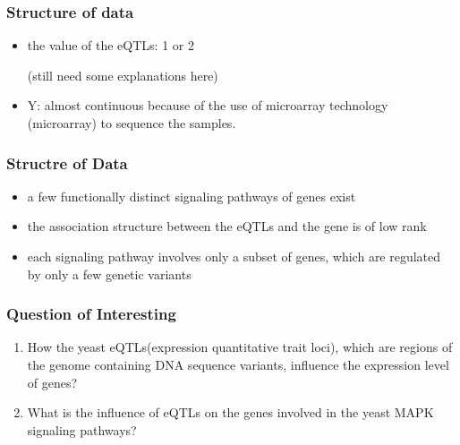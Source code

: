 \begin{frame}\frametitle{Structure of data}
    \begin{itemize}
        \item the value of the eQTLs: 1 or 2
    
        (still need some explanations here)

        \item Y: almost continuous because of the use of microarray technology (microarray) to sequence the samples.
      
    \end{itemize}
\end{frame}

\begin{frame}\frametitle{Structre of Data}
    \begin{itemize}
        \item a few functionally distinct signaling pathways of genes exist
        \item the association structure between the eQTLs and the gene is of low rank
        \item each signaling pathway involves only a subset of genes, which are regulated by only a few genetic variants
    \end{itemize}
\end{frame}



   

\begin{frame}\frametitle{Question of Interesting}
    \begin{enumerate}
        \item How the yeast eQTLs(expression quantitative trait loci), which are regions of the genome containing DNA sequence variants, influence the expression level of genes? 
        \item What is the influence of eQTLs on the genes involved in the yeast MAPK signaling pathways?
    \end{enumerate}
\end{frame}

